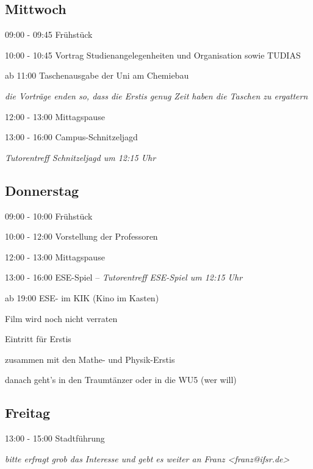 \documentclass[a4paper,12pt]{report}
\begin{document}
\subsection{Mittwoch}
\begin{itemize*}
\item 09:00 - 09:45 Frühstück
\item 10:00 - 10:45 Vortrag Studienangelegenheiten und Organisation sowie TUDIAS
\item ab 11:00 Taschenausgabe der Uni am Chemiebau
\begin{itemize*}
  \item \small{\textit{die Vorträge enden so, dass die Erstis genug Zeit haben die Taschen zu ergattern}}
\end{itemize*}
\item 12:00 - 13:00 Mittagspause
\item 13:00 - 16:00 Campus-Schnitzeljagd
\begin{itemize*}
  \item \small{\textit{Tutorentreff Schnitzeljagd um 12:15 Uhr}}
\end{itemize*}
\end{itemize*}

\subsection{Donnerstag}
\begin{itemize*}
\item 09:00 - 10:00 Frühstück
\item 10:00 - 12:00 Vorstellung der Professoren
\item 12:00 - 13:00 Mittagspause
\item 13:00 - 16:00 ESE-Spiel -- \small{\textit{Tutorentreff ESE-Spiel um 12:15 Uhr}}
\item ab 19:00 ESE- im KIK (Kino im Kasten)
\begin{itemize*}
	\item Film wird noch nicht verraten
	\item Eintritt für Erstis 
	\item zusammen mit den Mathe- und Physik-Erstis
	\item danach geht's in den Traumtänzer oder in die WU5 (wer will)
\end{itemize*}
\end{itemize*}

\subsection{Freitag}
\begin{itemize*}
\item 13:00 - 15:00 Stadtführung
\begin{itemize*}
  \item \small{\textit{bitte erfragt grob das Interesse und gebt es weiter an Franz <franz@ifsr.de>}}
\end{itemize*}
\end{itemize*}
\end{document}
